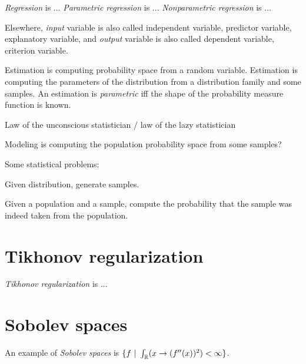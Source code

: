 \emph{Regression} is ...
\emph{Parametric regression} is ...
\emph{Nonparametric regression} is ...

Elsewhere,
%
%
%
%
%
%
%
%
\emph{input}
variable is also called independent variable, predictor variable, explanatory variable,
and
%
%
%
%
%
%
\emph{output} variable is also called dependent variable, criterion variable.

Estimation is computing probability space from a random variable.
Estimation is computing the parameters of the distribution from a distribution family and some samples.
An estimation is \emph{parametric} iff the shape of the probability measure function is known.

Law of the unconscious statistician / law of the lazy statistician

Modeling is computing the population probability space from some samples?

Some statistical problems:
\begin{enumerate*}[label={(\arabic*)}]
    \item Given distribution, generate samples.
    \item
Given a population and a sample, compute the probability that
the sample was indeed taken from the population.
\end{enumerate*}

\section{Tikhonov regularization}

\emph{Tikhonov regularization} is ...

\section{Sobolev spaces}

%
An example of \emph{Sobolev spaces} is \( \{ f ~|~ \int_{\mathbb{R}} (x \to (f''(x))^2) < \infty \} \).
